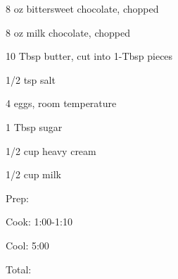 \documentclass[oneside]{book}  %
\begin{document}
\begin{IT}[0.811]
  \begin{ingredients}
    \item[8 oz] bittersweet chocolate, chopped
    \item[8 oz] milk chocolate, chopped
    \item[10 Tbsp] butter, cut into 1-Tbsp pieces
    \item[1/2 tsp] salt
    \item[4] eggs, room temperature
    \item[1 Tbsp] sugar 
    \item[1/2 cup] heavy cream
    \item[1/2 cup] milk
  \end{ingredients}

  \switchcolumn

  \begin{timeline}
    \item[Prep:]  \todo
    \item[Cook:]  1:00-1:10
    \item[Cool:]  5:00
    \item[Total:] \todo
  \end{timeline}
\end{IT}
\end{document}
